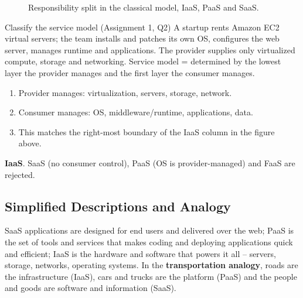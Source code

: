 \begin{figure}[H]
\centering
{}
\caption{Responsibility split in the classical model, IaaS, PaaS and SaaS.}
\end{figure}

\begin{solved}{Classify the service model (Assignment 1, Q2)}
\Given A startup rents Amazon EC2 virtual servers; the team installs and patches its own OS,
configures the web server, manages runtime and applications. The provider supplies only
virtualized compute, storage and networking.
\Formula Service model = determined by the lowest layer the provider manages and the first layer the
consumer manages.
\Steps
\begin{enumerate}[leftmargin=*]
  \item Provider manages: virtualization, servers, storage, network.
  \item Consumer manages: OS, middleware/runtime, applications, data.
  \item This matches the right-most boundary of the IaaS column in the figure above.
\end{enumerate}
\Answer \textbf{IaaS}. SaaS (no consumer control), PaaS (OS is provider-managed) and FaaS are rejected.
\end{solved}

\subsection{Simplified Descriptions and Analogy}
SaaS applications are designed for end users and delivered over the web; PaaS is the set of tools
and services that makes coding and deploying applications quick and efficient; IaaS is the hardware
and software that powers it all -- servers, storage, networks, operating systems. In the
\textbf{transportation analogy}, roads are the infrastructure (IaaS), cars and trucks are the platform
(PaaS) and the people and goods are software and information (SaaS).

